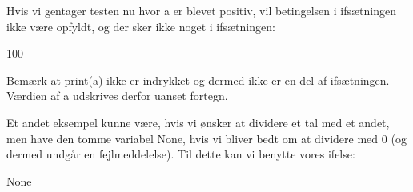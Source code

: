 \documentclass[letterpaper,10pt,english]{jupyterBook}
\begin{document}
Hvis vi gentager testen nu hvor a er blevet positiv, vil betingelsen i if\sphinxhyphen{}sætningen ikke være opfyldt, og der sker ikke noget i if\sphinxhyphen{}sætningen:

\begin{sphinxVerbatim}[commandchars=\\\{\}]
    
         
\end{sphinxVerbatim}

\begin{sphinxVerbatim}[commandchars=\\\{\}]
100
\end{sphinxVerbatim}

Bemærk at print(a) ikke er indrykket og dermed ikke er en del af if\sphinxhyphen{}sætningen. Værdien af a udskrives derfor uanset fortegn.

Et andet eksempel kunne være, hvis vi ønsker at dividere et tal med et andet, men have den tomme variabel None, hvis vi bliver bedt om at dividere med 0 (og dermed undgår en fejlmeddelelse). Til dette kan vi benytte vores if\sphinxhyphen{}else:

\begin{sphinxVerbatim}[commandchars=\\\{\}]
  
  

    
        
 
         

\end{sphinxVerbatim}

\begin{sphinxVerbatim}[commandchars=\\\{\}]
None
\end{sphinxVerbatim}
\end{document}
